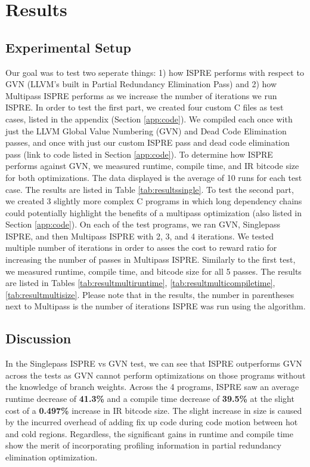 \documentclass[sigplan,screen]{acmart}
\begin{document}
    \section{Results}
	\label{sec:results}

    \subsection{Experimental Setup}
    Our goal was to test two seperate things: 1) how ISPRE performs with respect to GVN (LLVM's built in Partial Redundancy Elimination Pass) and 2) how Multipass ISPRE performs as we increase the number of iterations we run ISPRE. In order to test the first part, we created four custom C files as test cases, listed in the appendix (Section \ref{app:code}). We compiled each once with just the LLVM Global Value Numbering (GVN) and Dead Code Elimination passes, and once with just our custom ISPRE pass and dead code elimination pass (link to code listed in Section \ref{app:code}). To determine how ISPRE performs against GVN, we measured runtime, compile time, and IR bitcode size for both optimizations. The data displayed is the average of 10 runs for each test case. The results are listed in Table \ref{tab:resultssingle}. To test the second part, we created 3 slightly more complex C programs in which long dependency chains could potentially highlight the benefits of a multipass optimization (also listed in Section \ref{app:code}). On each of the test programs, we ran GVN, Singlepass ISPRE, and then Multipass ISPRE with 2, 3, and 4 iterations. We tested multiple number of iterations in order to asses the cost to reward ratio for increasing the number of passes in Multipass ISPRE. Similarly to the first test, we measured runtime, compile time, and bitcode size for all 5 passes. The results are listed in Tables \ref{tab:resultmultiruntime}, \ref{tab:resultmulticompiletime}, \ref{tab:resultmultisize}. Please note that in the results, the number in parentheses next to Multipass is the number of iterations ISPRE was run using the algorithm. 

    \subsection{Discussion}

    In the Singlepass ISPRE vs GVN test, we can see that ISPRE outperforms GVN across the tests as GVN cannot perform optimizations on those programs without the knowledge of branch weights. Across the 4 programs, ISPRE saw an average runtime decrease of \textbf{41.3\%} and a compile time decrease of \textbf{39.5\%} at the slight cost of a \textbf{0.497\%} increase in IR bitcode size. The slight increase in size is caused by the incurred overhead of adding fix up code during code motion between hot and cold regions. Regardless, the significant gains in runtime and compile time show the merit of incorporating profiling information in partial redundancy elimination optimization.
\end{document}
